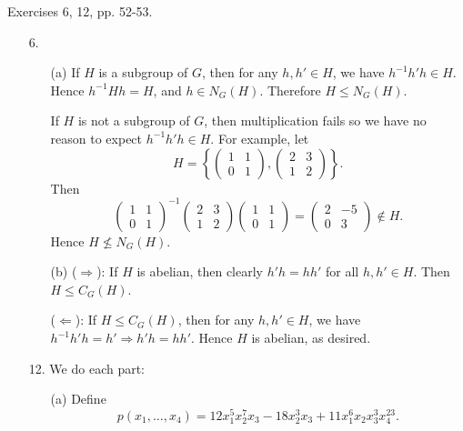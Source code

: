\documentclass[12pt]{article}
\theoremstyle{remark}
\theoremstyle{named}
\renewcommand{\implies}{\Rightarrow}
\begin{document}
Exercises 6, 12, pp. 52-53.

\begin{enumerate}
    \item [6.]
    \begin{enumerate}
        \item [(a)] If \(H\) is a subgroup of \(G\), then for any \(h, h' \in H\), we have \(h^{-1}h'h \in H\). Hence \(h^{-1}Hh = H\), and \(h \in N_G(H)\). Therefore \(H \le N_G(H)\). 
        
        If \(H\) is not a subgroup of \(G\), then multiplication fails so we have no reason to expect \(h^{-1}h'h \in H\). For example, let 
        \[H = \left\{\begin{pmatrix}
            1 & 1 \\ 0 & 1
        \end{pmatrix}, \begin{pmatrix}
            2 & 3 \\ 1 & 2
        \end{pmatrix}\right\}.\]
    Then 
    \[\begin{pmatrix}
        1 & 1 \\ 0 & 1
    \end{pmatrix}^{-1} \begin{pmatrix}
        2 & 3 \\ 1 & 2
    \end{pmatrix} \begin{pmatrix}
        1 & 1 \\ 0 & 1
    \end{pmatrix} = \begin{pmatrix}
        2 & -5 \\ 0 & 3
    \end{pmatrix} \notin H.\]
    Hence \(H \nleq N_G(H)\).

    \item [(b)] (\(\implies\)): If \(H\) is abelian, then clearly \(h'h = hh'\) for all \(h, h' \in H\). Then \(H \le C_G(H)\).

    (\(\Leftarrow\)): If \(H \le C_G(H)\), then for any \(h, h' \in H\), we have \(h^{-1}h'h = h' \implies h'h = h h'\). Hence \(H\) is abelian, as desired.

    \end{enumerate}
    \item [12.] We do each part:
    \begin{enumerate}
        \item[(a)] Define 
        \[p(x_1, \dots, x_4) = 12x_1^5 x_2^7 x_3 - 18 x_2^3 x_3 + 11 x_1^6 x_2 x_3^3 x_4^{23}.\]
        

\end{enumerate}
\end{enumerate}
\end{document}
